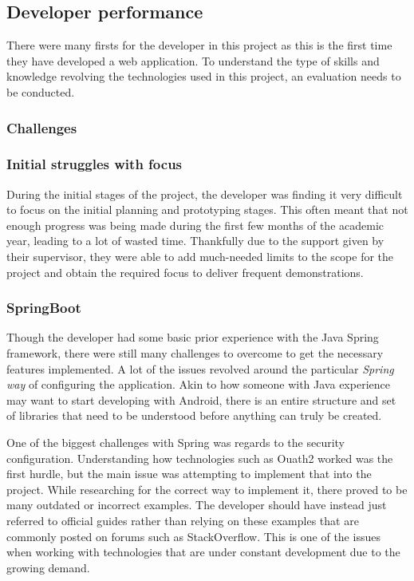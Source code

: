 \subsection{Developer performance}

There were many firsts for the developer in this project as this is the first time they have developed a web application.
To understand the type of skills and knowledge revolving the technologies used in this project, an evaluation needs to be conducted.


\subsubsection{Challenges}

\subsubsection*{Initial struggles with focus} \label{focusissues}
During the initial stages of the project, the developer was finding it very difficult to focus on the initial planning and prototyping stages.
This often meant that not enough progress was being made during the first few months of the academic year, leading to a lot of wasted time.
Thankfully due to the support given by their supervisor, they were able to add much-needed limits to the scope for the project and obtain the required focus to deliver frequent demonstrations.

\subsubsection*{SpringBoot}
Though the developer had some basic prior experience with the Java Spring framework, there were still many challenges to overcome 
to get the necessary features implemented.
A lot of the issues revolved around the particular \emph{Spring way} of configuring the application.
Akin to how someone with Java experience may want to start developing with Android, there is an entire structure and set of libraries
that need to be understood before anything can truly be created.

One of the biggest challenges with Spring was regards to the security configuration.
Understanding how technologies such as Ouath2 worked was the first hurdle, but the main issue was attempting to implement that into the project.
While researching for the correct way to implement it, there proved to be many outdated or incorrect examples. 
The developer should have instead just referred to official guides rather than relying on these examples that are commonly posted on forums
such as StackOverflow.
This is one of the issues when working with technologies that are under constant development due to the growing demand.

